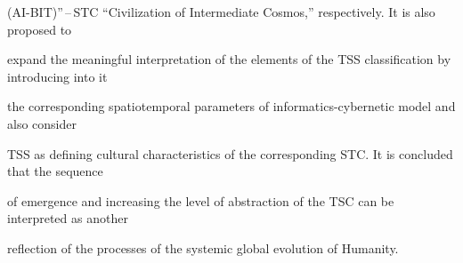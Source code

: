 { (AI-BIT)''\,--\,STC ``Civilization of Intermediate Cosmos,'' respectively. It is also proposed to 


expand the meaningful interpretation of the elements of the TSS classification by introducing into it 


the corresponding spatiotemporal parameters of informatics-cybernetic model and also consider 


TSS as defining cultural characteristics of the corresponding STC. It is concluded that the sequence 


of emergence and increasing the level of abstraction of the TSC can be interpreted as another 


reflection of the processes of the systemic global evolution of Humanity.} 















\vspace*{-12pt}

























\renewcommand{\bibname}{\protect\rmfamily References}







